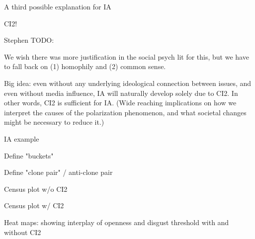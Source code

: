 \documentclass[12pt]{beamer}
\begin{document}
\begin{frame}[c]{A third possible explanation for IA} %

CI2!

{\tiny \color{red} 
Stephen TODO:

We wish there was more justification in the social psych lit for this, but we
have to fall back on (1) homophily and (2) common sense.
}

{\small \color{red} 
Big idea: even without any underlying ideological connection between issues,
and even without media influence, IA will naturally develop solely due to CI2.
In other words, CI2 is sufficient for IA. (Wide reaching implications on how we
interpret the causes of the polarization phenomenon, and what societal changes
might be necessary to reduce it.)
}

\end{frame}

\begin{frame}[c]{IA example} %

\end{frame}


\begin{frame}[c]{Define "buckets"} %

\end{frame}


\begin{frame}[c]{Define "clone pair" / anti-clone pair} %

\end{frame}



\begin{frame}[c]{Census plot w/o CI2} %

\end{frame}

\begin{frame}[c]{Census plot w/ CI2} %

\end{frame}

\begin{frame}[c]{Heat maps: showing interplay of openness and disgust threshold
with and without CI2} %

\end{frame}


%
%
%
%
\end{document}
